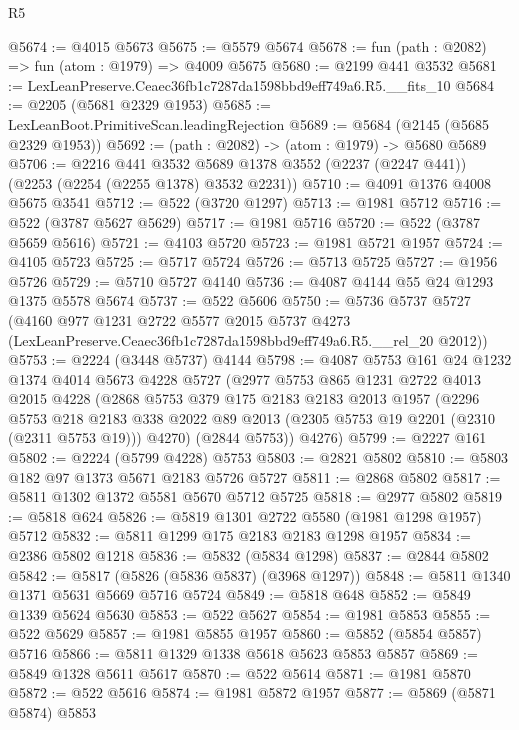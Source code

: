 \begin{lexlean}{R5}
\begin{coremodule}
@5674 := @4015 @5673
@5675 := @5579 @5674
@5678 := fun (path : @2082) => fun (atom : @1979) => @4009 @5675
@5680 := @2199 @441 @3532
@5681 := LexLeanPreserve.Ceaec36fb1c7287da1598bbd9eff749a6.R5.__fits_10
@5684 := @2205 (@5681 @2329 @1953)
@5685 := LexLeanBoot.PrimitiveScan.leadingRejection
@5689 := @5684 (@2145 (@5685 @2329 @1953))
@5692 := (path : @2082) -> (atom : @1979) -> @5680 @5689
@5706 := @2216
    @441
    @3532
    @5689
    @1378
    @3552
    (@2237 (@2247 @441))
    (@2253 (@2254 (@2255 @1378) @3532 @2231))
@5710 := @4091 @1376 @4008 @5675 @3541
@5712 := @522 (@3720 @1297)
@5713 := @1981 @5712
@5716 := @522 (@3787 @5627 @5629)
@5717 := @1981 @5716
@5720 := @522 (@3787 @5659 @5616)
@5721 := @4103 @5720
@5723 := @1981 @5721 @1957
@5724 := @4105 @5723
@5725 := @5717 @5724
@5726 := @5713 @5725
@5727 := @1956 @5726
@5729 := @5710 @5727 @4140
@5736 := @4087 @4144 @55 @24 @1293 @1375 @5578 @5674
@5737 := @522 @5606
@5750 := @5736
    @5737
    @5727
    (@4160
      @977
      @1231
      @2722
      @5577
      @2015
      @5737
      @4273
      (LexLeanPreserve.Ceaec36fb1c7287da1598bbd9eff749a6.R5.__rel_20 @2012))
@5753 := @2224 (@3448 @5737) @4144
@5798 := @4087
    @5753
    @161
    @24
    @1232
    @1374
    @4014
    @5673
    @4228
    @5727
    (@2977
      @5753
      @865
      @1231
      @2722
      @4013
      @2015
      @4228
      (@2868
        @5753
        @379
        @175
        @2183
        @2183
        @2013
        @1957
        (@2296
          @5753
          @218
          @2183
          @338
          @2022
          @89
          @2013
          (@2305 @5753 @19 @2201 (@2310 (@2311 @5753 @19)))
          @4270)
        (@2844 @5753))
      @4276)
@5799 := @2227 @161
@5802 := @2224 (@5799 @4228) @5753
@5803 := @2821 @5802
@5810 := @5803 @182 @97 @1373 @5671 @2183 @5726 @5727
@5811 := @2868 @5802
@5817 := @5811 @1302 @1372 @5581 @5670 @5712 @5725
@5818 := @2977 @5802
@5819 := @5818 @624
@5826 := @5819 @1301 @2722 @5580 (@1981 @1298 @1957) @5712
@5832 := @5811 @1299 @175 @2183 @2183 @1298 @1957
@5834 := @2386 @5802 @1218
@5836 := @5832 (@5834 @1298)
@5837 := @2844 @5802
@5842 := @5817 (@5826 (@5836 @5837) (@3968 @1297))
@5848 := @5811 @1340 @1371 @5631 @5669 @5716 @5724
@5849 := @5818 @648
@5852 := @5849 @1339 @5624 @5630
@5853 := @522 @5627
@5854 := @1981 @5853
@5855 := @522 @5629
@5857 := @1981 @5855 @1957
@5860 := @5852 (@5854 @5857) @5716
@5866 := @5811 @1329 @1338 @5618 @5623 @5853 @5857
@5869 := @5849 @1328 @5611 @5617
@5870 := @522 @5614
@5871 := @1981 @5870
@5872 := @522 @5616
@5874 := @1981 @5872 @1957
@5877 := @5869 (@5871 @5874) @5853

\end{coremodule}
\end{lexlean}
